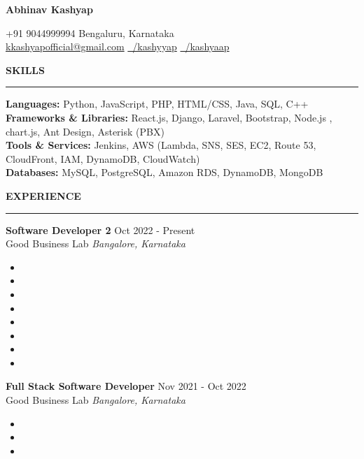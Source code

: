 \documentclass[10pt]{article}
\newcommand{\name}[1]{
    \begin{center}
        {\LARGE \bfseries #1}
    \end{center}
}
\newcommand{\contact}[1]{
    \begin{center}
        {\small #1}
    \end{center}
}
\newcommand{\rSection}[1]{
    \vspace{1em}
    {\large \bfseries \MakeUppercase{#1}}
    \vspace{0.5em}
    \hrule
}
\begin{document}
\name{Abhinav Kashyap}
\vspace{-3pt}
\contact{+91 9044999994  Bengaluru, Karnataka \\
\vspace{2pt}
\href{mailto:kkashyapofficial@gmail.com}{kkashyapofficial@gmail.com} \hspace{1em}
\href{https://www.linkedin.com/in/kashyyap/}{\faLinkedin\ /kashyyap} \hspace{1em}
\href{https://github.com/kashyaap}{\faGithub\ /kashyaap}}

\vspace{-12pt}
\rSection{Skills}
\textbf{Languages:} Python, JavaScript, PHP, HTML/CSS, Java, SQL, C++ \\[3pt]
\textbf{Frameworks \& Libraries:} React.js, Django, Laravel, Bootstrap, Node.js , chart.js, Ant Design, Asterisk (PBX) \\[3pt]
\textbf{Tools \& Services:} Jenkins, AWS (Lambda, SNS, SES, EC2, Route 53, CloudFront, IAM, DynamoDB, CloudWatch) \\[3pt]
\textbf{Databases:} MySQL, PostgreSQL, Amazon RDS, DynamoDB, MongoDB \\

\vspace{-17pt}
\rSection{Experience}

\textbf{Software Developer 2} \hfill Oct 2022 - Present\\
Good Business Lab \hfill \textit{Bangalore, Karnataka}
\begin{itemize}
    \item %
    \item %
    \item %
    \item %
    \item %
    \item %
    \item %
    \item %
\end{itemize}

\textbf{Full Stack Software Developer} \hfill Nov 2021 - Oct 2022\\
Good Business Lab \hfill \textit{Bangalore, Karnataka}
\begin{itemize}\vspace{2pt}
    \itemsep 1pt {} 
    \item %
    \item %
    \item %
\end{itemize}
\end{document}
